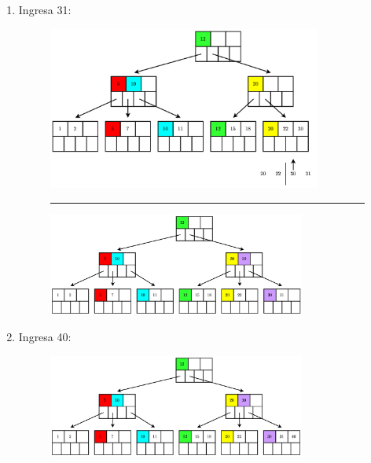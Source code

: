 \documentclass{templateNote}
\begin{document}
\begin{itemize}
\begin{enumerate}
\begin{enumerate}
\begin{enumerate}
                \newpage
                \item Ingresa 31:
                \begin{figure}[H]
                    \centering
                    \includegraphics[width=0.85\textwidth]{diagram/P3-1-13-1.png}
                    \rule{\textwidth}{1pt}
                    \includegraphics[width=0.8\textwidth]{diagram/P3-1-13-2.png}
                \end{figure}

                \item Ingresa 40:
                \begin{figure}[H]
                    \centering
                    \includegraphics[width=0.8\textwidth]{diagram/P3-1-14.png}
                \end{figure}


\end{enumerate}
\end{enumerate}
\end{enumerate}
\end{itemize}
\end{document}
